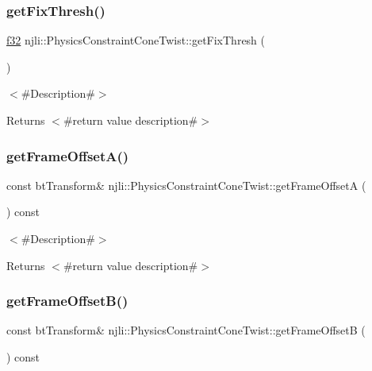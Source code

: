 \subsubsection{\texorpdfstring{get\+Fix\+Thresh()}{getFixThresh()}}
{\footnotesize\ttfamily \mbox{\hyperlink{_util_8h_a5f6906312a689f27d70e9d086649d3fd}{f32}} njli\+::\+Physics\+Constraint\+Cone\+Twist\+::get\+Fix\+Thresh (\begin{DoxyParamCaption}{ }\end{DoxyParamCaption})}

$<$\#\+Description\#$>$

\begin{DoxyReturn}{Returns}
$<$\#return value description\#$>$ 
\end{DoxyReturn}
\mbox{\label{classnjli_1_1_physics_constraint_cone_twist_af59e5ea018cd7346aa8cbb63ba54e9e6}} 
\subsubsection{\texorpdfstring{get\+Frame\+Offset\+A()}{getFrameOffsetA()}}
{\footnotesize\ttfamily const bt\+Transform\& njli\+::\+Physics\+Constraint\+Cone\+Twist\+::get\+Frame\+OffsetA (\begin{DoxyParamCaption}{ }\end{DoxyParamCaption}) const}

$<$\#\+Description\#$>$

\begin{DoxyReturn}{Returns}
$<$\#return value description\#$>$ 
\end{DoxyReturn}
\mbox{\label{classnjli_1_1_physics_constraint_cone_twist_a4e7b8678b101ddc4e0ead4d12a9e802e}} 
\subsubsection{\texorpdfstring{get\+Frame\+Offset\+B()}{getFrameOffsetB()}}
{\footnotesize\ttfamily const bt\+Transform\& njli\+::\+Physics\+Constraint\+Cone\+Twist\+::get\+Frame\+OffsetB (\begin{DoxyParamCaption}{ }\end{DoxyParamCaption}) const}

